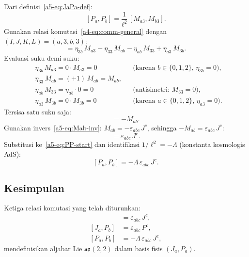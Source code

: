 Dari definisi~\eqref{a5-eq:JaPa-def}:
\begin{equation}\label{a5-eq:PP-start}
    [P_a, P_b] = \frac{1}{\ell^2}\,[M_{a3}, M_{b3}].
\end{equation}
Gunakan relasi komutasi~\eqref{a4-eq:comm-general} dengan $(I,J,K,L) = (a,3,b,3)$:
\begin{equation}
    [M_{a3}, M_{b3}] = \eta_{3b}\,M_{a3} - \eta_{33}\,M_{ab} - \eta_{ab}\,M_{33} + \eta_{a3}\,M_{3b}.
\end{equation}
Evaluasi suku demi suku:
\begin{align}
    &\eta_{3b}\,M_{a3} = 0 \cdot M_{a3} = 0 && \text{(karena $b \in \{0,1,2\}$, $\eta_{3b} = 0$)}, \nonumber\\[2pt]
    &\eta_{33}\,M_{ab} = (+1)\,M_{ab} = M_{ab}, && \nonumber\\[2pt]
    &\eta_{ab}\,M_{33} = \eta_{ab} \cdot 0 = 0 && \text{(antisimetri: $M_{33} = 0$)}, \nonumber\\[2pt]
    &\eta_{a3}\,M_{3b} = 0 \cdot M_{3b} = 0 && \text{(karena $a \in \{0,1,2\}$, $\eta_{a3} = 0$)}.
\end{align}
Tersisa satu suku saja:
\begin{equation}
    [M_{a3}, M_{b3}] = -M_{ab}.
\end{equation}
Gunakan invers~\eqref{a5-eq:Mab-inv}: $M_{ab} = -\varepsilon_{abc}\,J^c$, sehingga $-M_{ab} = \varepsilon_{abc}\,J^c$:
\begin{equation}
    [M_{a3}, M_{b3}] = \varepsilon_{abc}\,J^c.
\end{equation}
Substitusi ke~\eqref{a5-eq:PP-start} dan identifikasi $1/\ell^2 = -\Lambda$ (konstanta kosmologis AdS):
\begin{equation}\label{a5-eq:PP-result}
    [P_a, P_b] = -\Lambda\,\varepsilon_{abc}\,J^c.
\end{equation}

\subsection{Kesimpulan}

Ketiga relasi komutasi yang telah diturunkan:
\begin{align}
    [J_a, J_b] &= \varepsilon_{abc}\,J^c, \label{a5-eq:summary-JJ}\\[4pt]
    [J_a, P_b] &= \varepsilon_{abc}\,P^c, \label{a5-eq:summary-JP}\\[4pt]
    [P_a, P_b] &= -\Lambda\,\varepsilon_{abc}\,J^c, \label{a5-eq:summary-PP}
\end{align}
mendefinisikan aljabar Lie $\mathfrak{so}(2,2)$ dalam basis fisis $(J_a, P_a)$.


